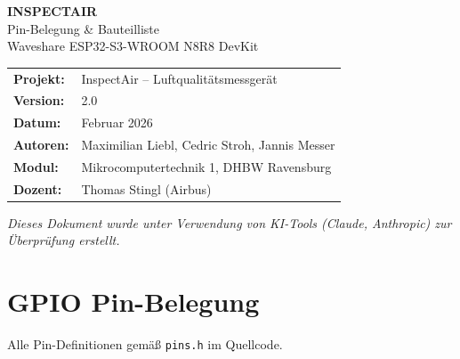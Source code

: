\documentclass[a4paper,11pt]{article}
\begin{document}
\begin{center}
{\LARGE\textbf{INSPECTAIR}}\\[0.3cm]
{\Large Pin-Belegung \& Bauteilliste}\\[0.3cm]
{\large Waveshare ESP32-S3-WROOM N8R8 DevKit}\\[0.5cm]
\begin{tabular}{ll}
\textbf{Projekt:} & InspectAir -- Luftqualitätsmessgerät \\
\textbf{Version:} & 2.0 \\
\textbf{Datum:} & Februar 2026 \\
\textbf{Autoren:} & Maximilian Liebl, Cedric Stroh, Jannis Messer \\
\textbf{Modul:} & Mikrocomputertechnik 1, DHBW Ravensburg \\
\textbf{Dozent:} & Thomas Stingl (Airbus) \\
\end{tabular}
\end{center}

\vspace{0.5cm}
\noindent\textit{Dieses Dokument wurde unter Verwendung von KI-Tools (Claude, Anthropic) zur Überprüfung erstellt.}
\vspace{0.3cm}

\tableofcontents
\newpage

\section{GPIO Pin-Belegung}

Alle Pin-Definitionen gemäß \texttt{pins.h} im Quellcode.
\end{document}
